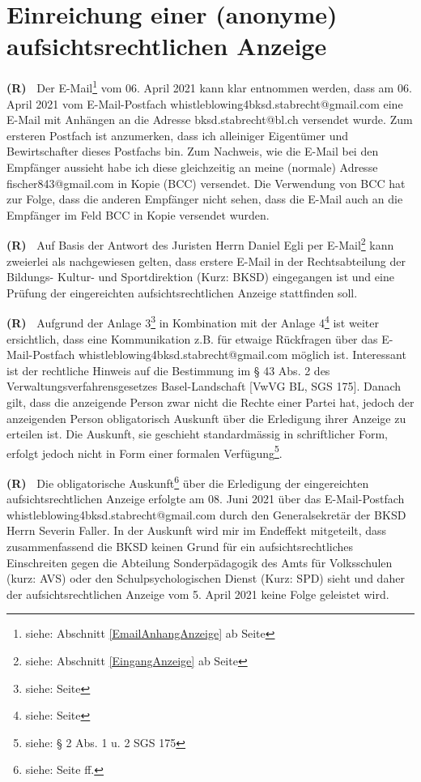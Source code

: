 \documentclass[paper=a4,fontsize=12pt, oneside, numbers=noenddot]{scrbook}
\newcounter{rz}
\newcommand{\Rz}{
	\addtocounter{rz}{1}\textbf{(R\arabic{rz})~}
}
\newcommand{\footnoteExt}[1]{\footnote{siehe: Abschnitt \ref{#1} ab Seite \pageref{#1}}}
\begin{document}
\section{Einreichung einer (anonyme) aufsichtsrechtlichen Anzeige}
\Rz Der E-Mail\footnoteExt{EmailAnhangAnzeige} vom 06. April 2021 kann klar entnommen werden, dass am 06. April 2021 vom E-Mail-Postfach whistleblowing4bksd.stabrecht@gmail.com eine E-Mail mit Anhängen an die Adresse bksd.stabrecht@bl.ch versendet wurde. Zum ersteren Postfach ist anzumerken, dass ich alleiniger Eigentümer und Bewirtschafter dieses Postfachs bin. Zum Nachweis, wie die E-Mail bei den Empfänger aussieht habe ich diese gleichzeitig an meine (normale) Adresse fischer843@gmail.com in Kopie (BCC) versendet. Die Verwendung von BCC hat zur Folge, dass die anderen Empfänger nicht sehen, dass die E-Mail auch an die Empfänger im Feld BCC in Kopie versendet wurden. 

\Rz Auf Basis der Antwort des Juristen Herrn Daniel Egli per E-Mail\footnoteExt{EingangAnzeige} kann zweierlei als nachgewiesen gelten, dass erstere E-Mail in der Rechtsabteilung der Bildungs- Kultur- und Sportdirektion (Kurz: BKSD) eingegangen ist und eine Prüfung der eingereichten aufsichtsrechtlichen Anzeige stattfinden soll. 

\Rz Aufgrund der Anlage 3\footnote{siehe:  Seite \pageref{NachfrageAnzeige}} in Kombination mit der Anlage 4\footnote{siehe:  Seite \pageref{AntwortNachfrageAnzeige}} ist weiter ersichtlich, dass eine Kommunikation z.B. für etwaige Rückfragen über das E-Mail-Postfach whistleblowing4bksd.stabrecht@gmail.com möglich ist. Interessant ist der rechtliche Hinweis auf die Bestimmung im § 43 Abs. 2 des Verwaltungsverfahrensgesetzes Basel-Landschaft [VwVG BL, SGS 175]. Danach gilt, dass die anzeigende Person zwar nicht die Rechte einer Partei hat, jedoch der anzeigenden Person obligatorisch Auskunft über die Erledigung ihrer Anzeige zu erteilen ist. Die Auskunft, sie geschieht  standardmässig in schriftlicher Form, erfolgt jedoch nicht in Form einer formalen Verfügung\footnote{siehe: § 2 Abs. 1 u. 2 SGS 175}.

\Rz Die obligatorische Auskunft\footnote{siehe: Seite \pageref{EntscheidAnzeige} ff.} über die Erledigung der eingereichten aufsichtsrechtlichen Anzeige erfolgte am 08. Juni 2021 über das E-Mail-Postfach whistleblowing4bksd.stabrecht@gmail.com durch den Generalsekretär der BKSD Herrn Severin Faller. In der Auskunft wird mir im Endeffekt mitgeteilt, dass zusammenfassend die BKSD keinen Grund für ein aufsichtsrechtliches Einschreiten gegen die Abteilung Sonderpädagogik des Amts für Volksschulen (kurz: AVS) oder den Schulpsychologischen Dienst (Kurz: SPD) sieht und daher der aufsichtsrechtlichen Anzeige vom 5. April 2021 keine Folge geleistet wird.
\end{document}

